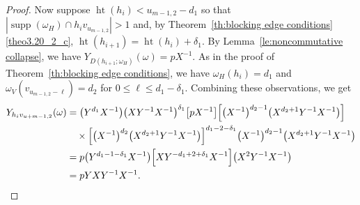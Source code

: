 \documentclass[10pt]{amsart}
\theoremstyle{definition}
\DeclareMathOperator{\hgt}{ht}
\DeclareMathOperator{\supp}{supp}
\begin{document}
\begin{proof}
 Now suppose $\hgt(h_i)<u_{m-1,2}-d_1$ so that $|\supp(\omega_H)\cap h_iv_{u_{m-1,2}}|>1$ and, by Theorem~\ref{th:blocking edge conditions}\ref{theo3.20_2_c}, $\hgt(h_{i+1})=\hgt(h_i)+\delta_1$.
 By Lemma~\ref{le:noncommutative collapse}, we have $Y_{D(h_{i+1};\omega_H)}(\omega)=pX^{-1}$.
 As in the proof of Theorem~\ref{th:blocking edge conditions}, we have $\omega_H(h_i)=d_1$ and $\omega_V(v_{u_{m-1,2}-\ell})=d_2$ for $0\le\ell\le d_1-\delta_1$.
 Combining these observations, we get
 \begin{align*}
 Y_{h_iv_{u+{m-1,2}}}(\omega) 
 &=\big(Y^{d_1}X^{-1}\big)\big(XY^{-1}X^{-1}\big)^{\delta_1}\big[pX^{-1}\big]\Big[\big(X^{-1}\big)^{d_2-1}\big(X^{d_2+1}Y^{-1}X^{-1}\big)\Big]\\
 &\quad\times\Big[\big(X^{-1}\big)^{d_2}\big(X^{d_2+1}Y^{-1}X^{-1}\big)\Big]^{d_1-2-\delta_1}\big(X^{-1}\big)^{d_2-1}\big(X^{d_2+1}Y^{-1}X^{-1}\big)\\
 &=p\big(Y^{d_1-1-\delta_1}X^{-1}\big)\Big[XY^{-d_1+2+\delta_1}X^{-1}\Big]\big(X^2Y^{-1}X^{-1}\big)\\
 &=pYXY^{-1}X^{-1}.\qedhere
 \end{align*}
\end{proof}
\end{document}
